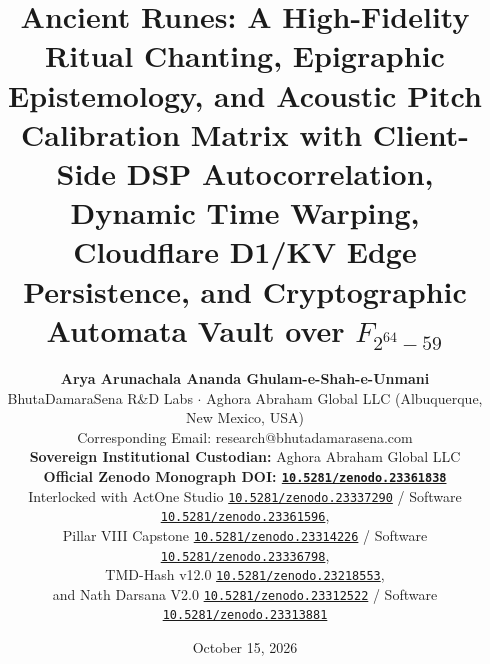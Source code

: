 \documentclass[11pt,a4paper,reqno]{article}
\newcommand{\zenodo}[1]{\href{https://doi.org/10.5281/zenodo.#1}{\nolinkurl{10.5281/zenodo.#1}}}
\def\texttt#1{#1}%
\def\mathbb#1{#1}%
\theoremstyle{plain}
\theoremstyle{definition}
\theoremstyle{remark}
\numberwithin{equation}{section}
\begin{document}
\title{\Large\textbf{Ancient Runes: A High-Fidelity Ritual Chanting, Epigraphic Epistemology, and Acoustic Pitch Calibration Matrix with Client-Side DSP Autocorrelation, Dynamic Time Warping, Cloudflare D1/KV Edge Persistence, and Cryptographic Automata Vault over $\mathbb{F}_{2^{64}-59}$}}

\author{
  \textbf{Arya Arunachala Ananda Ghulam-e-Shah-e-Unmani}\\[0.3em]
  \small BhutaDamaraSena R\&D Labs \quad $\cdot$ \quad Aghora Abraham Global LLC (Albuquerque, New Mexico, USA)\\
  \small Corresponding Email: \texttt{research@bhutadamarasena.com}\\[0.5em]
  \small \textbf{Sovereign Institutional Custodian:} Aghora Abraham Global LLC\\
  \small \textbf{Official Zenodo Monograph DOI: \zenodo{23361838}}\\[0.4em]
  \small Interlocked with ActOne Studio \zenodo{23337290} / Software \zenodo{23361596},\\
  \small Pillar VIII Capstone \zenodo{23314226} / Software \zenodo{23336798},\\
  \small TMD-Hash v12.0 \zenodo{23218553},\\
  \small and Nath Darsana V2.0 \zenodo{23312522} / Software \zenodo{23313881}
}

\date{October 15, 2026}

\maketitle
\end{document}
